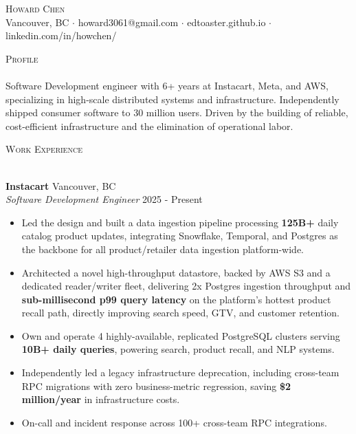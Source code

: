 \documentclass[a4paper]{article}
\newcommand{\lineunder} {
    \vspace*{-8pt} \\
    \hspace*{-18pt} \hrulefill \\
}
\newcommand{\header} [1] {
    {\hspace*{-18pt}\vspace*{6pt} \textsc{#1}}
    \vspace*{-6pt} \lineunder
}
\begin{document}
\vspace*{-40pt}

    

\vspace*{-10pt}
\begin{center}
	{\Huge \scshape {Howard Chen}}\\
	Vancouver, BC $\cdot$ howard3061@gmail.com $\cdot$ edtoaster.github.io $\cdot$ linkedin.com/in/howchen/
\end{center}

\header{Profile}
\vspace{1mm}
Software Development engineer with 6+ years at Instacart, Meta, and AWS, specializing in high-scale distributed systems and infrastructure. Independently shipped consumer software to 30 million users. Driven by the building of reliable, cost-efficient infrastructure and the elimination of operational labor.
\vspace{2mm}

\header{Work Experience}
\vspace{1mm}

\textbf{Instacart} \hfill Vancouver, BC\\
\textit{Software Development Engineer} \hfill 2025 - Present\\
\vspace{-1mm}
\begin{itemize} \itemsep 1pt
    \item Led the design and built a data ingestion pipeline processing \textbf{125B+} daily catalog product updates, integrating Snowflake, Temporal, and Postgres as the backbone for all product/retailer data ingestion platform-wide.
    \item Architected a novel high-throughput datastore, backed by AWS S3 and a dedicated reader/writer fleet, delivering 2x Postgres ingestion throughput and \textbf{sub-millisecond p99 query latency} on the platform's hottest product recall path, directly improving search speed, GTV, and customer retention.
    \item Own and operate 4 highly-available, replicated PostgreSQL clusters serving \textbf{10B+ daily queries}, powering search, product recall, and NLP systems.
    \item Independently led a legacy infrastructure deprecation, including cross-team RPC migrations with zero business-metric regression, saving \textbf{\$2 million/year} in infrastructure costs.
    \item On-call and incident response across 100+ cross-team RPC integrations.
\end{itemize}
\end{document}
